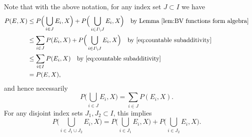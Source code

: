 \documentclass[11pt]{article}
\numberwithin{equation}{section}
\theoremstyle{plain}
\theoremstyle{definition}
\numberwithin{equation}{section}
\begin{document}
Note that with the above notation,
for any index set $J\subset I$ we have
\begin{align*}
P(E,X)
&\le P\Big(\bigcup_{i\in J}E_i,X\Big)
+P\Big(\bigcup_{i\in I\setminus J}E_i,X\Big)\quad
\textrm{by Lemma }\ref{lem:BV functions form algebra}\\
&\le \sum_{i\in J}P(E_i,X)+P\Big(\bigcup_{i\in I\setminus J}E_i,X\Big)
\quad\textrm{by }\eqref{eq:countable subadditivity}\\
&\le \sum_{i\in I}P(E_i,X)\quad\textrm{by }\eqref{eq:countable subadditivity}\\
&= P(E,X),
\end{align*}
and hence necessarily
\begin{equation}\label{eq:components subset}
P\Big(\bigcup_{i\in J}E_i,X\Big)=\sum_{i\in J}P(E_i,X).
\end{equation}
For any disjoint index sets $J_1,J_2\subset I$, this implies
\begin{equation}\label{eq:one component and the rest}
P\Big(\bigcup_{i\in J_1\cup J_2}E_i,X\Big)=P\Big(\bigcup_{i\in J_1}E_i,X\Big)+P\Big(\bigcup_{i\in J_2}E_i,X\Big).
\end{equation}
\end{document}
